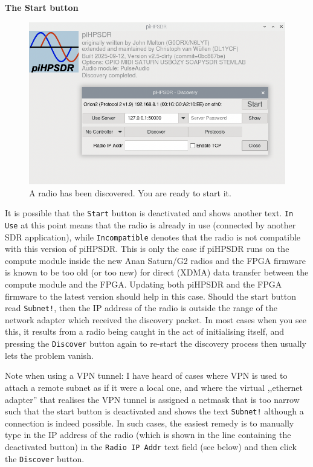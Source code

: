 \documentclass[12pt]{book}
\def\rett#1{\texttt{\color{red}#1}}
\def\pH{pi\-HPSDR\xspace}
\begin{document}
\clearpage
\textbf{The Start button}

\begin{figure}
\center
\includegraphics[scale=0.45]{Start.png}
\caption{A radio has been discovered. You are ready  to start it.}
\label{fig:Start}
\end{figure}

It is possible that the \rett{Start} button is deactivated and shows another text. \rett{In Use} at
this point means that the radio is already in use (connected by another SDR application), while
\rett{Incompatible} denotes that the radio is not compatible with this version of \pH. This
is only the case if \pH runs on the compute module inside the new Anan Saturn/G2
radios and the FPGA firmware is known to be too old (or too new)
for direct (XDMA) data transfer between the compute
module and the FPGA. Updating both \pH and the FPGA firmware to the latest version
should help in this case. Should the start button read \rett{Subnet!}, then the IP address of the
radio is outside the range of the network adapter which received the discovery packet.
In most cases when you see this, it results from a radio being caught in the act of initialising
itself, and pressing the \rett{Discover} button again to re-start the discovery process then
usually lets the problem vanish.

{\color{red} Note when using a VPN tunnel:} I have heard of cases where VPN is used to attach
a remote subnet as if it were a local one, and where the virtual  ,,ethernet adapter''
that realises the VPN tunnel is assigned a netmask that is too narrow such that the start
button is deactivated and shows the text \rett{Subnet!} although a connection is indeed possible.
In such cases, the easiest remedy is to manually type in the IP address of the radio (which is
shown in the line containing the deactivated button) in the \rett{Radio  IP Addr} text field
(see below) and then click the \rett{Discover} button.
\end{document}
